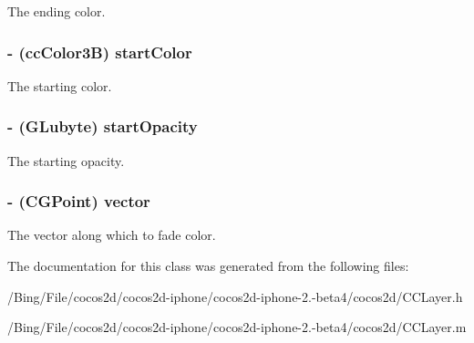 The ending color. \hypertarget{interface_c_c_layer_gradient_a0d7d758e03573dc191226deced04f573}{
\subsubsection[{start\-Color}]{\setlength{\rightskip}{0pt plus 5cm}-\/ ({\bf cc\-Color3\-B}) {\bf start\-Color}}}\label{interface_c_c_layer_gradient_a0d7d758e03573dc191226deced04f573}
The starting color. \hypertarget{interface_c_c_layer_gradient_a29b2945aaed5f50e0bf35d358de0bdde}{
\subsubsection[{start\-Opacity}]{\setlength{\rightskip}{0pt plus 5cm}-\/ (G\-Lubyte) {\bf start\-Opacity}}}\label{interface_c_c_layer_gradient_a29b2945aaed5f50e0bf35d358de0bdde}
The starting opacity. \hypertarget{interface_c_c_layer_gradient_a9e09efd298052caea75cf7517c98567c}{
\subsubsection[{vector}]{\setlength{\rightskip}{0pt plus 5cm}-\/ (C\-G\-Point) {\bf vector}}}\label{interface_c_c_layer_gradient_a9e09efd298052caea75cf7517c98567c}
The vector along which to fade color. 

The documentation for this class was generated from the following files\-:\begin{DoxyCompactItemize}
\item 
/\-Bing/\-File/cocos2d/cocos2d-\/iphone/cocos2d-\/iphone-\/2.-\/beta4/cocos2d/C\-C\-Layer.\-h\item 
/\-Bing/\-File/cocos2d/cocos2d-\/iphone/cocos2d-\/iphone-\/2.-\/beta4/cocos2d/C\-C\-Layer.\-m\end{DoxyCompactItemize}
